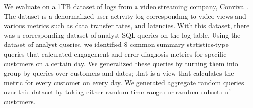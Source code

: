 We evaluate \svc on a 1TB dataset of logs from a video streaming company, Conviva \cite{conviva}.
The dataset is a denormalized user activity log corresponding to video views and various metrics such as data transfer rates, and latencies.
With this dataset, there was a corresponding dataset of analyst SQL queries on the log table.
Using the dataset of analyst queries, we identified 8 common summary statistics-type queries that calculated engagement and error-diagnosis metrics for specific customers on a certain day.
We generalized these queries by turning them into group-by queries over customers and dates; that is a view that calculates the metric for every customer on every day.
We generated aggregate random queries over this dataset by taking either random time ranges or random subsets of customers.

